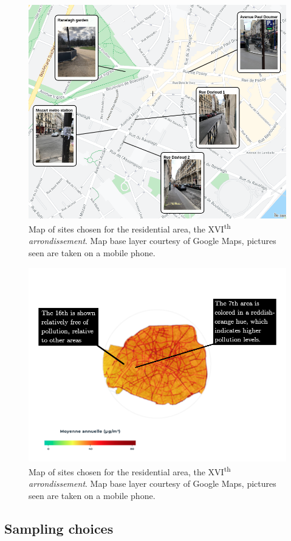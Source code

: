 \documentclass[11pt,letterpaper]{article}
\begin{document}
\begin{figure}[H]
    \begin{minipage}{\textwidth}
    \centering
    \includegraphics[width=0.7\linewidth]{16esites.png}
    \caption{Map of sites chosen for the residential area, the XVI\textsuperscript{th} \textit{arrondissement}. Map base layer courtesy of Google Maps, pictures seen are taken on a mobile phone.}
    \end{minipage}
\end{figure}

\begin{figure}[H]
    \begin{minipage}{\textwidth}
    \centering
    \includegraphics[width=0.7\linewidth]{no2_map.png}
    \caption{Map of sites chosen for the residential area, the XVI\textsuperscript{th} \textit{arrondissement}. Map base layer courtesy of Google Maps, pictures seen are taken on a mobile phone.}
    \end{minipage}
\end{figure}

\subsection{Sampling choices}
\end{document}
